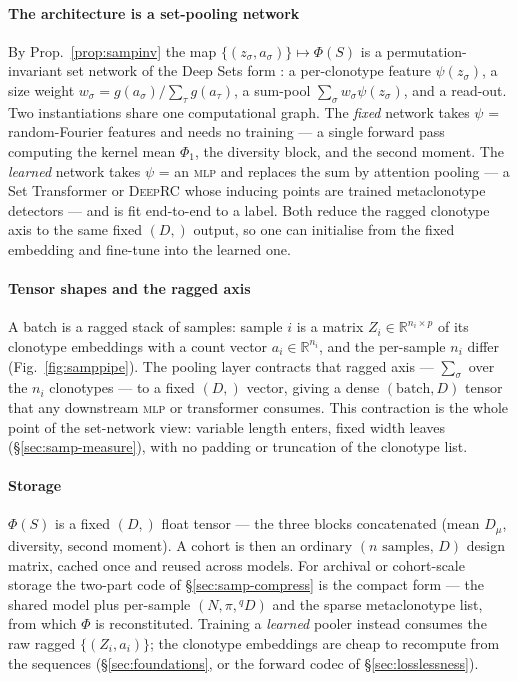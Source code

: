 \documentclass[11pt]{article}
\theoremstyle{oldplain}
\theoremstyle{oldrem}
\newcommand{\R}{\mathds{R}}  %
\begin{document}
\paragraph{The architecture is a set-pooling network} By Prop.~\ref{prop:sampinv} the map
$\{(z_\sigma,a_\sigma)\}\mapsto\Phi(S)$ is a permutation-invariant set network of the Deep Sets form
\cite{Zaheer2017}: a per-clonotype feature $\psi(z_\sigma)$, a size weight
$w_\sigma=g(a_\sigma)/\!\sum_\tau g(a_\tau)$, a sum-pool $\sum_\sigma w_\sigma\psi(z_\sigma)$, and a read-out.
Two instantiations share one computational graph. The \emph{fixed} network takes $\psi$ = random-Fourier
features and needs no training --- a single forward pass computing the kernel mean $\Phi_1$, the diversity
block, and the second moment. The \emph{learned} network takes $\psi$ = an {\scshape mlp} and replaces the sum
by attention pooling --- a Set Transformer or {\scshape DeepRC} \cite{Lee2019,Widrich2020} whose inducing points
are trained metaclonotype detectors --- and is fit end-to-end to a label. Both reduce the ragged clonotype axis
to the same fixed $(D,)$ output, so one can initialise from the fixed embedding and fine-tune into the learned
one.

\paragraph{Tensor shapes and the ragged axis} A batch is a ragged stack of samples: sample $i$ is a matrix
$Z_i\in\R^{n_i\times p}$ of its clonotype embeddings with a count vector $a_i\in\R^{n_i}$, and the per-sample
$n_i$ differ (Fig.~\ref{fig:samppipe}). The pooling layer contracts that ragged axis --- $\sum_\sigma$ over the
$n_i$ clonotypes --- to a fixed $(D,)$ vector, giving a dense $(\text{batch},D)$ tensor that any downstream
{\scshape mlp} or transformer consumes. This contraction is the whole point of the set-network view: variable
length enters, fixed width leaves (\S\ref{sec:samp-measure}), with no padding or truncation of the clonotype
list.

\paragraph{Storage} $\Phi(S)$ is a fixed $(D,)$ float tensor --- the three blocks concatenated (mean $D_\mu$,
diversity, second moment). A cohort is then an ordinary $(\text{$n$ samples},\,D)$ design matrix, cached once
and reused across models. For archival or cohort-scale storage the two-part code of \S\ref{sec:samp-compress}
is the compact form --- the shared model plus per-sample $(N,\pi,{}^qD)$ and the sparse metaclonotype list, from
which $\Phi$ is reconstituted. Training a \emph{learned} pooler instead consumes the raw ragged
$\{(Z_i,a_i)\}$; the clonotype embeddings are cheap to recompute from the sequences (\S\ref{sec:foundations}, or
the forward codec of \S\ref{sec:losslessness}).
\end{document}
